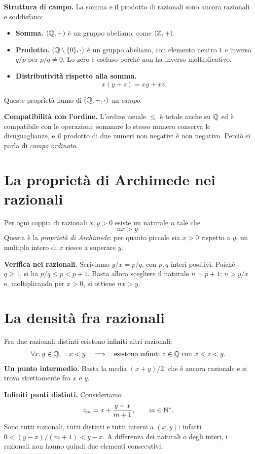 \textbf{Struttura di campo.} La somma e il prodotto di razionali sono ancora razionali e soddisfano:
\begin{itemize}
  \item \textbf{Somma.} $(\mathbb{Q},+)$ è un gruppo abeliano, come $(\mathbb{Z},+)$.
  \item \textbf{Prodotto.} $(\mathbb{Q}\setminus\{0\},\cdot)$ è un gruppo abeliano, con elemento neutro $1$ e inverso $q/p$ per $p/q\ne0$. Lo zero è escluso perché non ha inverso moltiplicativo.
  \item \textbf{Distributività rispetto alla somma.}
  \[
    x(y+z)=xy+xz.
  \]
\end{itemize}
Queste proprietà fanno di $(\mathbb{Q},+,\cdot)$ un \emph{campo}.

\textbf{Compatibilità con l'ordine.} L'ordine usuale $\le$ è totale anche su $\mathbb{Q}$ ed è compatibile con le operazioni: sommare lo stesso numero conserva le disuguaglianze, e il prodotto di due numeri non negativi è non negativo. Perciò si parla di \emph{campo ordinato}.

\section{La proprietà di Archimede nei razionali}

Per ogni coppia di razionali $x,y>0$ esiste un naturale $n$ tale che
\[
  nx>y.
\]
Questa è la \emph{proprietà di Archimede}: per quanto piccolo sia $x>0$ rispetto a $y$, un multiplo intero di $x$ riesce a superare $y$.

\textbf{Verifica nei razionali.} Scriviamo $y/x=p/q$, con $p,q$ interi positivi. Poiché $q\ge1$, si ha $p/q\le p<p+1$. Basta allora scegliere il naturale $n=p+1$: $n>y/x$ e, moltiplicando per $x>0$, si ottiene $nx>y$.

\section{La densità fra razionali}

Fra due razionali distinti esistono infiniti altri razionali:
\[
  \forall x,y\in\mathbb{Q},\quad x<y
  \quad\Longrightarrow\quad
  \text{esistono infiniti }z\in\mathbb{Q}\text{ con }x<z<y.
\]
\textbf{Un punto intermedio.} Basta la media $(x+y)/2$, che è ancora razionale e si trova strettamente fra $x$ e $y$.

\textbf{Infiniti punti distinti.} Consideriamo
\[
  z_m=x+\frac{y-x}{m+1},\qquad m\in\mathbb{N}^*.
\]
Sono tutti razionali, tutti distinti e tutti interni a $(x,y)$: infatti $0<(y-x)/(m+1)<y-x$. A differenza dei naturali o degli interi, i razionali non hanno quindi due elementi consecutivi.

